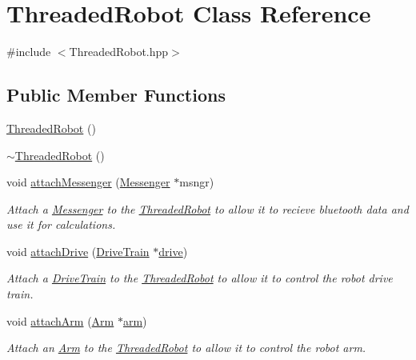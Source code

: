 \hypertarget{class_threaded_robot}{}\section{Threaded\+Robot Class Reference}
\label{class_threaded_robot}


{\ttfamily \#include $<$Threaded\+Robot.\+hpp$>$}

\subsection*{Public Member Functions}
\begin{DoxyCompactItemize}
\item 
\hyperlink{class_threaded_robot_a4516decdf3303ded4e77fcb2b61b0c5a}{Threaded\+Robot} ()
\item 
\hyperlink{class_threaded_robot_a67fb3fb389da8a81de483045806684e5}{$\sim$\+Threaded\+Robot} ()
\item 
void \hyperlink{class_threaded_robot_afc27bf260266c249fc7ce2895a20882f}{attach\+Messenger} (\hyperlink{class_messenger}{Messenger} $\ast$msngr)
\begin{DoxyCompactList}\small\item\em Attach a \hyperlink{class_messenger}{Messenger} to the \hyperlink{class_threaded_robot}{Threaded\+Robot} to allow it to recieve bluetooth data and use it for calculations. \end{DoxyCompactList}\item 
void \hyperlink{class_threaded_robot_a86ab3f2f83958858e47c50004702bba7}{attach\+Drive} (\hyperlink{class_drive_train}{Drive\+Train} $\ast$\hyperlink{class_threaded_robot_ad666af7d773c8096210f6b5c4d060086}{drive})
\begin{DoxyCompactList}\small\item\em Attach a \hyperlink{class_drive_train}{Drive\+Train} to the \hyperlink{class_threaded_robot}{Threaded\+Robot} to allow it to control the robot drive train. \end{DoxyCompactList}\item 
void \hyperlink{class_threaded_robot_ab6b42cc3e28dad7823f35afea5ceb4cc}{attach\+Arm} (\hyperlink{class_arm}{Arm} $\ast$\hyperlink{class_threaded_robot_afc4445eed32ecc9c375e17ccf4f37241}{arm})
\begin{DoxyCompactList}\small\item\em Attach an \hyperlink{class_arm}{Arm} to the \hyperlink{class_threaded_robot}{Threaded\+Robot} to allow it to control the robot arm. \end{DoxyCompactList}\item 

\end{DoxyCompactItemize}
